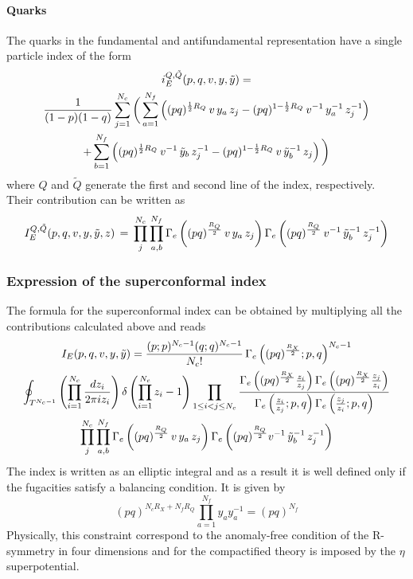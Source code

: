\paragraph{Quarks}
The quarks in the fundamental and antifundamental representation have a single particle index of the form
\begin{multline}
i_E^{Q,\tilde{Q}} (p,q,v,y,\tilde{y})=\\ 
{1\over (1-p)(1-q)} \sum_{j=1}^{N_c}
\bigg(  \sum_{a=1}^{N_f} \left(  
(p q)^{{1\over 2}R_Q} \, v \, y_a \, z_j
- (p q)^{1- {1\over 2} R_Q} \, v^{-1} \, y_a^{-1} \, z_j^{-1} \right)\\
 +
 \sum_{b=1}^{N_f} \left(  
(p q)^{{1\over 2}R_Q}\, v^{-1}\, {\tilde y}_b \,z_j^{-1}
- (p q)^{1- {1\over 2}R_Q} \, v\, {\tilde y_b}^{-1}\, z_j \right)\bigg) 
\end{multline}
where $Q$ and $\tilde{Q} $ generate the first and second line of the index, respectively.\\
Their contribution can be written as
\begin{equation}
I_E^{Q,\tilde{Q}} ( p ,q,v,y,\tilde{y},z) \, = \, \prod_{ j}^{ N_c} \prod_{ a,b}^{N_f} \Gamma_e \left( (pq)^{R_Q \over 2} \, v  \,  y_a \,  z_j \right)
\Gamma_e \left( (pq)^{R_Q \over 2}\,  v^{-1} \,  {\tilde y_b}^{-1}\,  z_j^{-1}\right)
\end{equation}
\subsubsection{Expression of the superconformal index }
The formula for the superconformal index can be obtained by multiplying all the contributions calculated above and reads
\begin{multline}
I_{E} ( p,q,v,y,\tilde y ) = 
	\frac{ (p;p)^{N_c-1} ( q;q)^{N_c-1} }{ N_c !} \, \Gamma_e \left(   (pq)^\frac{R_X}{2};p,q\right)^{N_c-1} \\
\oint_{T^{N_c-1}} \left( \prod_{i=1}^{N_c } { d z_i \over { 2 \pi i z_i} } \right) \delta \left( \prod_{i=1}^{N_c} z_i - 1 \right)
\prod_{ 1 \leq i < j \leq N_c} \frac{ \Gamma_e \left( (pq)^\frac{R_X}{2} {z_i \over z_j} \right) \Gamma_e \left( (pq)^\frac{R_X}{2} {z_j \over z_i} \right) }{ \Gamma_e \left( {z_i \over z_j};p,q \right) \Gamma_e \left({z_j \over z_i}; p,q \right)} \\
 \prod_{ j}^{  N_c} \prod_{ a,b}^{ N_f} \Gamma_e \left( (pq)^{R_Q \over 2} \, v \,  y_a \,  z_j \right)
\Gamma_e \left( (pq)^{R_Q \over 2} v^{-1} \, \tilde {y}_b^{-1}\,  z_j^{-1}\right)
\end{multline}
The index is written as an elliptic integral and as a result it is well defined only if the fugacities satisfy a balancing condition.
It is given by
\begin{equation}
(pq)^{N_c R_X + N_f R_Q} \prod_{a=1}^{N_f} y_a  y_a^{-1} = (pq)^{N_f}
\label{eqn:fugacities_condition_index}
\end{equation}
Physically, this constraint correspond to the anomaly-free condition of the R-symmetry in four dimensions and for the compactified theory is imposed by the $\eta$ superpotential.  

